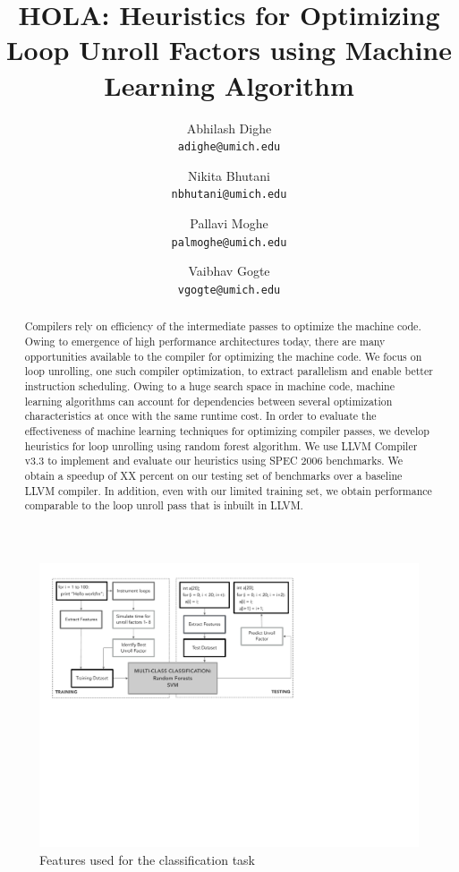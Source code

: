 \documentclass[]{sig-alternate}
\author{
  Abhilash Dighe\\
  \texttt{adighe@umich.edu} 
  \and
  Nikita Bhutani\\
  \texttt{nbhutani@umich.edu}
  \and
  Pallavi Moghe\\
  \texttt{palmoghe@umich.edu} 
  \and
  Vaibhav Gogte\\
  \texttt{vgogte@umich.edu}
}
\title{HOLA: Heuristics for Optimizing Loop Unroll Factors using Machine Learning Algorithm\\\vspace{-4mm}}
\begin{document}
\makeatletter
\def\@copyrightspace{\relax}
\makeatother

\maketitle



\begin{abstract}
Compilers rely on efficiency of the intermediate passes to optimize the machine code. Owing to emergence of high performance architectures today, there are many opportunities available to the compiler for optimizing the machine code. We focus on loop unrolling, one such compiler optimization, to extract parallelism and enable better instruction scheduling. Owing to a huge search space in machine code, machine learning algorithms can account for dependencies between several optimization characteristics at once with the same runtime cost. In order to evaluate the effectiveness of machine learning techniques for optimizing compiler passes, we develop heuristics for loop unrolling using random forest algorithm.  We use LLVM Compiler v3.3 to implement and evaluate our heuristics using SPEC 2006 benchmarks. We obtain a speedup of XX percent on our testing set of benchmarks over a baseline LLVM compiler. In addition, even with our limited training set, we obtain performance comparable to the loop unroll pass that is inbuilt in LLVM.
\end{abstract}

\begin{figure}
  \center
  \includegraphics[width=0.90\linewidth]{fig/systemArchitecture.pdf}
  \caption{Features used for the classification task}
  \label{fig:systemArchitechture}
\end{figure}
\end{document}
